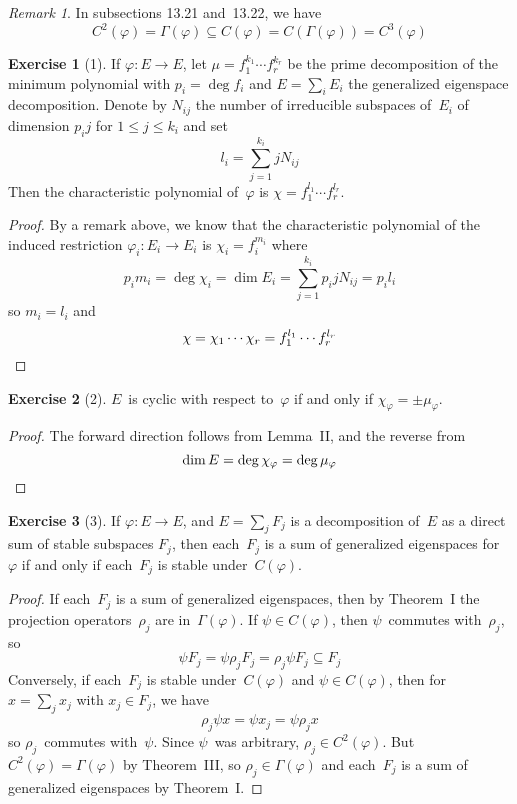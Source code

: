 \documentclass[letterpaper,12pt]{article}
\theoremstyle{definition}
\newtheorem*{exer}{Exercise}
\theoremstyle{remark}
\newtheorem*{rmk}{Remark}
\begin{document}
\begin{rmk}
In subsections 13.21 and~13.22, we have
\[C^2(\varphi)=\Gamma(\varphi)\subseteq C(\varphi)=C(\Gamma(\varphi))=C^3(\varphi)\]
\end{rmk}

\begin{exer}[1]
If \(\varphi:E\to E\), let \(\mu=f_1^{k_1}\cdots f_r^{k_r}\) be the prime decomposition of the minimum polynomial with \(p_i=\deg f_i\) and \(E=\sum_i E_i\) the generalized eigenspace decomposition. Denote by \(N_{ij}\) the number of irreducible subspaces of~\(E_i\) of dimension \(p_ij\) for \(1\le j\le k_i\) and set
\[l_i=\sum_{j=1}^{k_i}jN_{ij}\]
Then the characteristic polynomial of~\(\varphi\) is \(\chi=f_1^{l_1}\cdots f_r^{l_r}\).
\end{exer}
\begin{proof}
By a remark above, we know that the characteristic polynomial of the induced restriction \(\varphi_i:E_i\to E_i\) is \(\chi_i=f_i^{m_i}\) where
\[p_im_i=\deg\chi_i=\dim E_i=\sum_{j=1}^{k_i}p_ijN_{ij}=p_i l_i\]
so \(m_i=l_i\) and
\[\chi=\chi_1\cdots\chi_r=f_1^{l_1}\cdots f_r^{l_r}\qedhere\]
\end{proof}

\begin{exer}[2]
\(E\)~is cyclic with respect to~\(\varphi\) if and only if \(\chi_{\varphi}=\pm\mu_{\varphi}\).
\end{exer}
\begin{proof}
The forward direction follows from Lemma~II, and the reverse from
\[\dim E=\deg\chi_{\varphi}=\deg\mu_{\varphi}\qedhere\]
\end{proof}

\begin{exer}[3]
If \(\varphi:E\to E\), and \(E=\sum_j F_j\) is a decomposition of~\(E\) as a direct sum of stable subspaces \(F_j\), then each~\(F_j\) is a sum of generalized eigenspaces for~\(\varphi\) if and only if each~\(F_j\) is stable under~\(C(\varphi)\).
\end{exer}
\begin{proof}
If each~\(F_j\) is a sum of generalized eigenspaces, then by Theorem~I the projection operators~\(\rho_j\) are in~\(\Gamma(\varphi)\). If \(\psi\in C(\varphi)\), then \(\psi\)~commutes with~\(\rho_j\), so
\[\psi F_j=\psi\rho_j F_j=\rho_j\psi F_j\subseteq F_j\]
Conversely, if each~\(F_j\) is stable under~\(C(\varphi)\) and \(\psi\in C(\varphi)\), then for \(x=\sum_j x_j\) with \(x_j\in F_j\), we have
\[\rho_j\psi x=\psi x_j=\psi\rho_j x\]
so \(\rho_j\)~commutes with~\(\psi\). Since \(\psi\)~was arbitrary, \(\rho_j\in C^2(\varphi)\). But \(C^2(\varphi)=\Gamma(\varphi)\) by Theorem~III, so \(\rho_j\in\Gamma(\varphi)\) and each~\(F_j\) is a sum of generalized eigenspaces by Theorem~I.
\end{proof}
\end{document}
